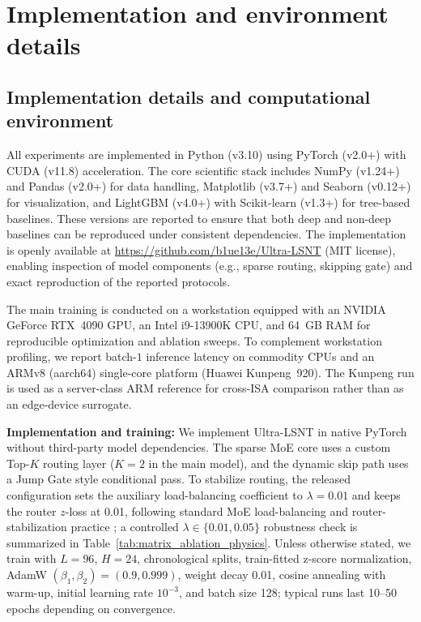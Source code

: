 ﻿\documentclass[review,1p,times]{elsarticle}
\begin{document}
\section{Implementation and environment details}\label{app:impl_details}

\subsection{Implementation details and computational environment}
\label{app:impl_details_sub}

All experiments are implemented in Python (v3.10) using PyTorch (v2.0+) with CUDA (v11.8) acceleration. The core scientific stack includes NumPy (v1.24+) and Pandas (v2.0+) for data handling, Matplotlib (v3.7+) and Seaborn (v0.12+) for visualization, and LightGBM (v4.0+) with Scikit-learn (v1.3+) for tree-based baselines. These versions are reported to ensure that both deep and non-deep baselines can be reproduced under consistent dependencies. The implementation is openly available at \url{https://github.com/b1ue13e/Ultra-LSNT} (MIT license), enabling inspection of model components (e.g., sparse routing, skipping gate) and exact reproduction of the reported protocols.

The main training is conducted on a workstation equipped with an NVIDIA GeForce RTX~4090 GPU, an Intel i9-13900K CPU, and 64~GB RAM for reproducible optimization and ablation sweeps. To complement workstation profiling, we report batch-$1$ inference latency on commodity CPUs and an ARMv8 (aarch64) single-core platform (Huawei Kunpeng~920). The Kunpeng run is used as a server-class ARM reference for cross-ISA comparison rather than as an edge-device surrogate.



\noindent\textbf{Implementation and training:} We implement Ultra-LSNT in native PyTorch without third-party model dependencies. The sparse MoE core uses a custom Top-$K$ routing layer ($K=2$ in the main model), and the dynamic skip path uses a Jump Gate style conditional pass. To stabilize routing, the released configuration sets the auxiliary load-balancing coefficient to $\lambda=0.01$ and keeps the router $z$-loss at 0.01, following standard MoE load-balancing and router-stabilization practice \citep{fedus2022switch}; a controlled $\lambda\in\{0.01,0.05\}$ robustness check is summarized in Table~\ref{tab:matrix_ablation_physics}. Unless otherwise stated, we train with $L=96$, $H=24$, chronological splits, train-fitted z-score normalization, AdamW $(\beta_1,\beta_2)=(0.9,0.999)$, weight decay 0.01, cosine annealing with warm-up, initial learning rate $10^{-3}$, and batch size 128; typical runs last 10--50 epochs depending on convergence.
\end{document}
